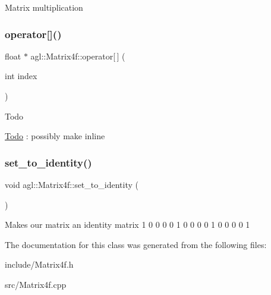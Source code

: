 Matrix multiplication \mbox{\label{classagl_1_1Matrix4f_acdb789b7069e850da3ae52e57155d0e0}} 
\subsubsection{\texorpdfstring{operator[]()}{operator[]()}}
{\footnotesize\ttfamily float $\ast$ agl\+::\+Matrix4f\+::operator\mbox{[}$\,$\mbox{]} (\begin{DoxyParamCaption}\item[{int}]{index }\end{DoxyParamCaption})}

\begin{DoxyRefDesc}{Todo}
\item[\mbox{\hyperlink{todo__todo000001}{Todo}}]\+: possibly make inline \end{DoxyRefDesc}
\mbox{\label{classagl_1_1Matrix4f_a51973ba1ec474b3c0cfd64d93691f04a}} 
\subsubsection{\texorpdfstring{set\_to\_identity()}{set\_to\_identity()}}
{\footnotesize\ttfamily void agl\+::\+Matrix4f\+::set\+\_\+to\+\_\+identity (\begin{DoxyParamCaption}{ }\end{DoxyParamCaption})}

Makes our matrix an identity matrix 1 0 0 0 0 1 0 0 0 0 1 0 0 0 0 1 

The documentation for this class was generated from the following files\+:\begin{DoxyCompactItemize}
\item 
include/Matrix4f.\+h\item 
src/Matrix4f.\+cpp\end{DoxyCompactItemize}
